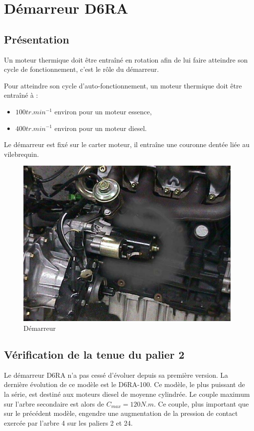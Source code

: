 \newpage

\section{Démarreur D6RA}

\subsection{Présentation}
Un moteur thermique doit être entraîné en rotation afin de lui faire atteindre son cycle de fonctionnement, c'est le rôle du démarreur.

Pour atteindre son cycle d'auto-fonctionnement, un moteur thermique doit être entraîné à :
\begin{itemize}
 \item $100 tr.min^{-1}$ environ pour un moteur essence,
 \item $400 tr.min^{-1}$ environ pour un moteur diesel.
\end{itemize}

Le démarreur est fixé sur le carter moteur, il entraîne une couronne dentée liée au vilebrequin.

\begin{figure}[!h]
  \centering\includegraphics[width=0.6\linewidth]{img/demarreur.jpg}
  \caption{Démarreur}
  \label{img3}
\end{figure}

\subsection{Vérification de la tenue du palier 2}

Le démarreur D6RA n'a pas cessé d'évoluer depuis sa première version. La dernière évolution de ce modèle est le D6RA-100. Ce modèle, le plus puissant de la série, est destiné aux moteurs diesel de moyenne cylindrée. Le couple maximum sur l'arbre secondaire est alors de $C_{max} = 120 N.m$. Ce couple, plus important que sur le précédent modèle, engendre une augmentation de la pression de contact exercée par l'arbre 4 sur les paliers 2 et 24.

